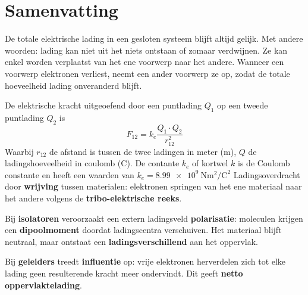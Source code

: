 \section{Samenvatting}
\begin{fullpage}
\begin{samenvatting}
	\begin{tcolorbox}[title=Behoud van Lading,colback=white,colframe=black,sharp corners]%
		De totale elektrische lading in een gesloten systeem blijft altijd gelijk. Met andere woorden: lading kan niet uit het niets ontstaan of zomaar verdwijnen. Ze kan enkel worden verplaatst van het ene voorwerp naar het andere. Wanneer een voorwerp elektronen verliest, neemt een ander voorwerp ze op, zodat de totale hoeveelheid lading onveranderd blijft.
	\end{tcolorbox}

	\begin{tcbitemize}[raster columns=2, varwidth upper, raster equal height=rows,
colframe=black,colback=white,fonttitle=\bfseries,sharp corners]
		\tcbitem[squeezed title={Wet van Coulomb}]
		De elektrische kracht uitgeoefend door een puntlading $Q_1$ op een tweede puntlading $Q_2$ is
		\begin{equation}\label{eq:coulombkracht}
			F_{12}=k_e\frac{Q_1\cdot Q_2}{r_{12}^2}
		\end{equation}
		Waarbij $r_{12}$ de afstand is tussen de twee ladingen in meter (\si{m}), $Q$ de ladingshoeveelheid in coulomb (\si{C}). De contante $k_e$ of kortwel $k$ is de Coulomb constante en heeft een waarden van $k_e =\qty{8,99e9}	{\newton\meter\squared\per\coulomb\squared}$
		\tcbitem[squeezed title={Tribo-Elektrisch Effect}]
		Ladingsoverdracht door \textbf{wrijving} tussen materialen: elektronen springen van het ene materiaal naar het andere volgens de \textbf{tribo-elektrische reeks}.
	\end{tcbitemize}
	
	\begin{tcolorbox}[title=Polarisatie en Influentie,colback=white,colframe=black,sharp corners]
		Bij \textbf{isolatoren} veroorzaakt een extern ladingsveld \textbf{polarisatie}: moleculen krijgen een \textbf{dipoolmoment} doordat ladingscentra verschuiven. Het materiaal blijft neutraal, maar ontstaat een \textbf{ladingsverschillend} aan het oppervlak.

		Bij \textbf{geleiders} treedt \textbf{influentie} op: vrije elektronen herverdelen zich tot elke lading geen resulterende kracht meer ondervindt. Dit geeft \textbf{netto oppervlaktelading}.


\end{tcolorbox}
\end{samenvatting}
\end{fullpage}
